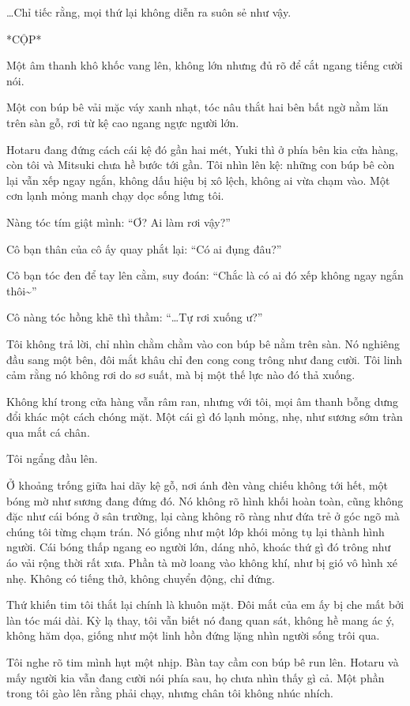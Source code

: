\documentclass[../main.tex]{subfiles}
\begin{document}
\dots Chỉ tiếc rằng, mọi thứ lại không diễn ra suôn sẻ như vậy.

*CỘP*

Một âm thanh khô khốc vang lên, không lớn nhưng đủ rõ để cắt ngang tiếng cười nói.

Một con búp bê vải mặc váy xanh nhạt, tóc nâu thắt hai bên bất ngờ nằm lăn trên sàn gỗ, rơi từ kệ cao ngang ngực người lớn.

Hotaru đang đứng cách cái kệ đó gần hai mét, Yuki thì ở phía bên kia cửa hàng, còn tôi và Mitsuki chưa hề bước tới gần. Tôi nhìn lên kệ: những con búp bê còn lại vẫn xếp ngay ngắn, không dấu hiệu bị xô lệch, không ai vừa chạm vào. Một cơn lạnh mỏng manh chạy dọc sống lưng tôi.

Nàng tóc tím giật mình: ``Ơ? Ai làm rơi vậy?''

Cô bạn thân của cô ấy quay phắt lại: ``Có ai đụng đâu?''

Cô bạn tóc đen để tay lên cằm, suy đoán: ``Chắc là có ai đó xếp không ngay ngắn thôi\~{}''

Cô nàng tóc hồng khẽ thì thầm: ``\dots Tự rơi xuống ư?''

Tôi không trả lời, chỉ nhìn chằm chằm vào con búp bê nằm trên sàn. Nó nghiêng đầu sang một bên, đôi mắt khâu chỉ đen cong cong trông như đang cười. Tôi linh cảm rằng nó không rơi do sơ suất, mà bị một thế lực nào đó thả xuống.

Không khí trong cửa hàng vẫn râm ran, nhưng với tôi, mọi âm thanh bỗng dưng đổi khác một cách chóng mặt. Một cái gì đó lạnh mỏng, nhẹ, như sương sớm tràn qua mắt cá chân.

Tôi ngẩng đầu lên.

Ở khoảng trống giữa hai dãy kệ gỗ, nơi ánh đèn vàng chiếu không tới hết, một bóng mờ như sương đang đứng đó. Nó không rõ hình khối hoàn toàn, cũng không đặc như cái bóng ở sân trường, lại càng không rõ ràng như đứa trẻ ở góc ngõ mà chúng tôi từng chạm trán. Nó giống như một lớp khói mỏng tụ lại thành hình người. Cái bóng thấp ngang eo người lớn, dáng nhỏ, khoác thứ gì đó trông như áo vải rộng thời rất xưa. Phần tà mờ loang vào không khí, như bị gió vô hình xé nhẹ. Không có tiếng thở, không chuyển động, chỉ đứng.

Thứ khiến tim tôi thắt lại chính là khuôn mặt. Đôi mắt của em ấy bị che mất bởi làn tóc mái dài. Kỳ lạ thay, tôi vẫn biết nó đang quan sát, không hề mang ác ý, không hăm dọa, giống như một linh hồn đứng lặng nhìn người sống trôi qua.

Tôi nghe rõ tim mình hụt một nhịp. Bàn tay cầm con búp bê run lên. Hotaru và mấy người kia vẫn đang cười nói phía sau, họ chưa nhìn thấy gì cả. Một phần trong tôi gào lên rằng phải chạy, nhưng chân tôi không nhúc nhích.
\end{document}

